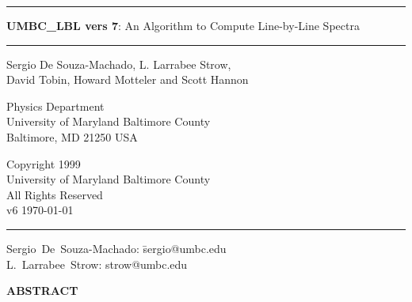 \documentclass[11pt]{article}
\newcommand{\HRule}{\rule{\linewidth}{1mm}}
\newcommand{\HRulethin}{\rule{\linewidth}{0.5mm}}
\begin{document}
\thispagestyle{empty}
\vspace{2.0in}

\noindent\HRule
\begin{center}
\Huge \textbf{\textsf{UMBC\_LBL} vers 7}: An Algorithm to Compute Line-by-Line 
Spectra
\end{center}
\noindent\HRule

\vspace{0.75in}
\begin{center}
\begin{Large}
Sergio De Souza-Machado, L. Larrabee Strow,\\ David Tobin, Howard Motteler 
and Scott Hannon
\end{Large}
\end{center}

\vspace{0.5in}
\begin{center}
Physics Department\\
University of Maryland Baltimore County\\Baltimore, MD 21250 USA\\
\end{center}

\vspace{0.5in}
\begin{center}
Copyright 1999 \\
University of Maryland Baltimore County \\
All Rights Reserved\\
v6  \today\\
\end{center}

\vfill

\noindent\HRulethin
\begin{flushleft}
\begin{tabbing}
Sergio~De~Souza-Machado: \=    sergio@umbc.edu \\
L.~Larrabee~Strow:   \>        strow@umbc.edu\\
\end{tabbing}
\end{flushleft}


\newpage
\tableofcontents
\listoftables
\listoffigures

\newpage

\begin{center}
{\bf ABSTRACT}
\end{center}
\end{document}
